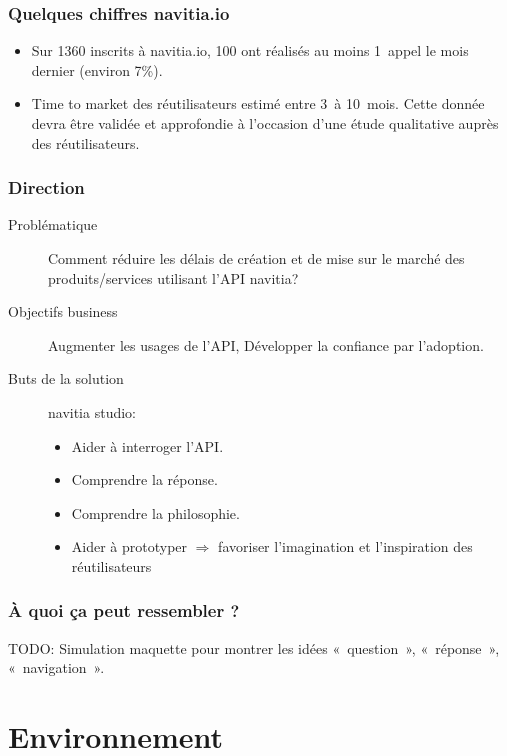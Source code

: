 \documentclass[table]{beamer}
\begin{document}
\begin{frame}
  \frametitle{Quelques chiffres navitia.io}

  \begin{itemize}
  \item Sur 1360 inscrits à navitia.io, 100 ont réalisés au moins
    1~appel le mois dernier (environ 7\%).
  \item Time to market des réutilisateurs estimé entre 3~à 10~mois.
    Cette donnée devra être validée et approfondie à l'occasion d'une
    étude qualitative auprès des réutilisateurs.
  \end{itemize}
\end{frame}

\begin{frame}
  \frametitle{Direction}

  \begin{description}
  \item[Problématique] Comment réduire les délais de création et de
    mise sur le marché des produits/services utilisant l'API navitia?
  \item[Objectifs business] Augmenter les usages de l'API, Développer
    la confiance par l'adoption.
  \item[Buts de la solution] navitia studio:
    \begin{itemize}
    \item Aider à interroger l'API.
    \item Comprendre la réponse.
    \item Comprendre la philosophie.
    \item Aider à prototyper $\Rightarrow$ favoriser l'imagination et
      l'inspiration des réutilisateurs
    \end{itemize}
  \end{description}
\end{frame}

\begin{frame}
  \frametitle{À quoi ça peut ressembler ?}

  TODO: Simulation maquette pour montrer les idées «~question~»,
  «~réponse~», «~navigation~».
\end{frame}

\section{Environnement}
\end{document}
